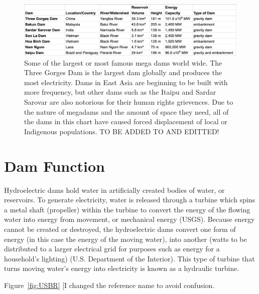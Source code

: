 \documentclass{book}\usepackage{knitr}
\begin{document}
\begin{figure}
\includegraphics[width=\textwidth]{images/Dam-chart.png}
\caption{Some of the largest or most famous mega dams world wide. The Three Gorges Dam is the largest dam globally and produces the most electricity. Dams in East Asia are beginning to be built with more frequency, but other dams such as the Itaipu and Sardar Sarovar are also notorious for their human rights grievences. Due to the nature of megadams and the amount of space they need, all of the dams in this chart have caused forced displacement of local or Indigenous populations. TO BE ADDED TO AND EDITTED! }
\label{fig:dams}
\end{figure}


\section{Dam Function}
  Hydroelectric dams hold water in artificially created bodies of water, or reservoirs. To generate electricity, water is released through a turbine which spins a metal shaft (propeller) within the turbine to convert the energy of the flowing water into energy from movement, or mechanical energy (USGS). Because energy cannot be created or destroyed, the hydroelectric dams convert one form of energy (in this case the energy of the moving water), into another (watts to be distributed to a larger electrical grid for purposes such as energy for a household’s lighting) (U.S. Department of the Interior). This type of turbine that turns moving water’s energy into electricity is known as a hydraulic turbine.


Figure~\ref{fig:USBR} [I changed the reference name to avoid confusion.
\end{document}
